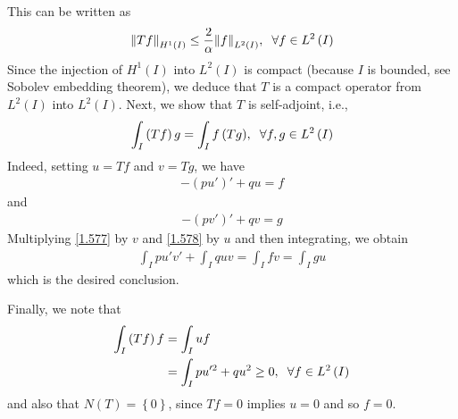 \documentclass[a4paper,oneside]{article}
\numberwithin{equation}{section}
\begin{document}
This can be written as
\begin{align}
{\left\| {Tf} \right\|_{{H^1}\left( I \right)}} \le \frac{2}{\alpha }{\left\| f \right\|_{{L^2}\left( I \right)}},\hspace{0.2cm}\forall f \in {L^2}\left( I \right)
\end{align}
Since the injection of $H^1\left(I\right)$ into $L^2\left(I\right)$ is compact (because $I$ is bounded, see Sobolev embedding theorem), we deduce that $T$ is a compact operator from $L^2\left(I\right)$ into $L^2\left(I\right)$. Next, we show that $T$ is self-adjoint, i.e.,
\begin{align}
\int_I {\left( {Tf} \right)g}  = \int_I {f\left( {Tg} \right)} ,\hspace{0.2cm} \forall f,g \in {L^2}\left( I \right)
\end{align}
Indeed, setting $u=Tf$ and $v=Tg$, we have
\begin{align}
\label{1.577}
 - \left( {pu'} \right)' + qu = f
\end{align}
and
\begin{align}
\label{1.578}
 - \left( {pv'} \right)' + qv = g
\end{align}
Multiplying \eqref{1.577} by $v$ and \eqref{1.578} by $u$ and then integrating, we obtain
\begin{align}
\int_I {pu'v'}  + \int_I {quv}  = \int_I {fv}  = \int_I {gu} 
\end{align}
which is the desired conclusion.

Finally, we note that
\begin{align}
\label{1.580}
\int_I {\left( {Tf} \right)f}  &= \int_I {uf} \\
 &= \int_I {pu{'^2} + q{u^2}}  \ge 0,\hspace{0.2cm}\forall f \in {L^2}\left( I \right) \label{1.581}
\end{align}
and also that $N\left( T \right) = \left\{ 0 \right\}$, since $Tf=0$ implies $u=0$ and so $f=0$.
\end{document}
